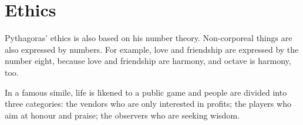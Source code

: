 \documentclass[11pt]{article}
\begin{document}
\section{Ethics}
Pythagoras’ ethics is also based on his number theory. 
Non-corporeal things are also expressed by numbers. 
For example, love and friendship are expressed by the number eight, because love and friendship are harmony, and octave is harmony, too. 

\newline

In a famous simile, life is likened to a public game and people are divided into three categories: 
the vendors who are only interested in profits; 
the players who aim at honour and praise; 
the observers who are seeking wisdom.
\end{document}
